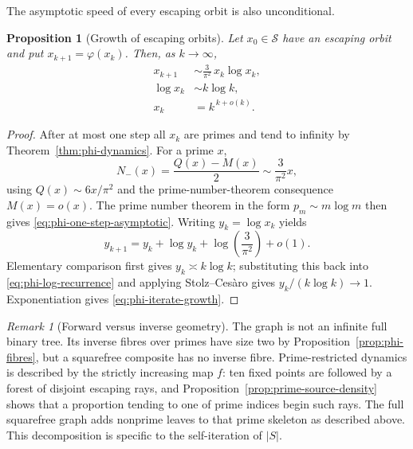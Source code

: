 \documentclass[11pt]{amsart}
\numberwithin{equation}{section}
\theoremstyle{plain}
\newtheorem{proposition}[theorem]{Proposition}
\theoremstyle{definition}
\theoremstyle{remark}
\newtheorem{remark}[theorem]{Remark}
\begin{document}
The asymptotic speed of every escaping orbit is also unconditional.

\begin{proposition}[Growth of escaping orbits]
\label{prop:phi-escape-rate}
Let $x_0\in\mathcal S$ have an escaping orbit and put
$x_{k+1}=\varphi(x_k)$.  Then, as $k\to\infty$,
\begin{align}
 x_{k+1}
 &\sim \frac{3}{\pi^2}\,x_k\log x_k,
\label{eq:phi-one-step-asymptotic}\\
 \log x_k
 &\sim k\log k,
\label{eq:phi-iterate-log-growth}\\
 x_k
 &=k^{\,k+o(k)}.
\label{eq:phi-iterate-growth}
\end{align}
\end{proposition}

\begin{proof}
After at most one step all $x_k$ are primes and tend to infinity by
Theorem~\ref{thm:phi-dynamics}.  For a prime $x$,
\begin{equation}
\label{eq:Nminus-prime-asymptotic}
N_-(x)=\frac{Q(x)-M(x)}2\sim\frac{3}{\pi^2}x,
\end{equation}
using $Q(x)\sim6x/\pi^2$ and the prime-number-theorem consequence $M(x)=o(x)$.
The prime number theorem in the form $p_m\sim m\log m$ then gives
\eqref{eq:phi-one-step-asymptotic}.  Writing $y_k=\log x_k$ yields
\begin{equation}
\label{eq:phi-log-recurrence}
y_{k+1}=y_k+\log y_k+\log\!\left(\frac{3}{\pi^2}\right)+o(1).
\end{equation}
Elementary comparison first gives $y_k\asymp k\log k$; substituting this back
into \eqref{eq:phi-log-recurrence} and applying Stolz--Ces\`aro gives
$y_k/(k\log k)\to1$.  Exponentiation gives
\eqref{eq:phi-iterate-growth}.
\end{proof}

\begin{remark}[Forward versus inverse geometry]
\label{rem:phi-forward-inverse}
The graph is not an infinite full binary tree.  Its inverse fibres over primes
have size two by Proposition~\ref{prop:phi-fibres}, but a squarefree composite
has no inverse fibre.  Prime-restricted dynamics is described by the strictly
increasing map $f$: ten fixed points are followed by a forest of disjoint
escaping rays, and Proposition~\ref{prop:prime-source-density} shows that a
proportion tending to one of prime indices begin such rays.  The full
squarefree graph adds nonprime leaves to that prime skeleton as described
above.  This decomposition is specific to the self-iteration of $|S|$.
\end{remark}
\end{document}
